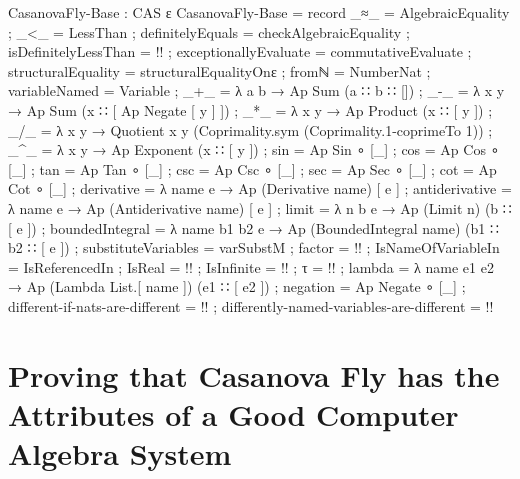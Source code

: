\documentclass{report}
\begin{document}
\begin{code}
CasanovaFly-Base : CAS ε
CasanovaFly-Base = record
  { _≈_ = AlgebraicEquality
  ; _<_ = LessThan
  ; definitelyEquals = checkAlgebraicEquality
  ; isDefinitelyLessThan = {!!}
  ; exceptionallyEvaluate = commutativeEvaluate
  ; structuralEquality = structuralEqualityOnε
  ; fromℕ = NumberNat
  ; variableNamed = Variable
  ; _+_ = λ a b → Ap Sum (a ∷ b ∷ [])
  ; _-_ = λ x y → Ap Sum (x ∷ [ Ap Negate [ y ] ])
  ; _*_ = λ x y → Ap Product (x ∷ [ y ])
  ; _/_ = λ x y → Quotient x y (Coprimality.sym (Coprimality.1-coprimeTo 1))
  ; _^_ = λ x y → Ap Exponent (x ∷ [ y ])
  ; sin = Ap Sin ∘ [_]
  ; cos = Ap Cos ∘ [_]
  ; tan = Ap Tan ∘ [_]
  ; csc = Ap Csc ∘ [_]
  ; sec = Ap Sec ∘ [_]
  ; cot = Ap Cot ∘ [_]
  ; derivative = λ name e → Ap (Derivative name) [ e ]
  ; antiderivative = λ name e → Ap (Antiderivative name) [ e ]
  ; limit = λ n b e → Ap (Limit n) (b ∷ [ e ])
  ; boundedIntegral = λ name b1 b2 e → Ap (BoundedIntegral name) (b1 ∷ b2 ∷ [ e ])
  ; substituteVariables = varSubstM
  ; factor = {!!}
  ; IsNameOfVariableIn = IsReferencedIn
  ; IsReal = {!!}
  ; IsInfinite = {!!}
  ; τ = {!!}
  ; lambda = λ name e1 e2 → Ap (Lambda List.[ name ]) (e1 ∷ [ e2 ])
  ; negation = Ap Negate ∘ [_]
  ; different-if-nats-are-different = {!!}
  ; differently-named-variables-are-different = {!!}
  }
\end{code}

\chapter{Proving that Casanova Fly has the Attributes of a Good Computer Algebra System}
\end{document}
